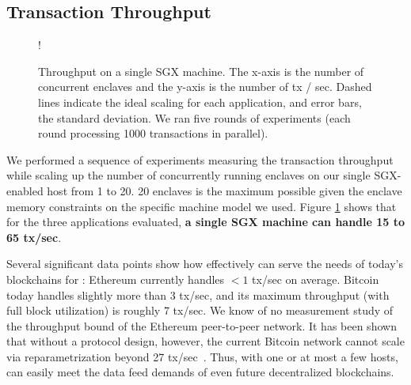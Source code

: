 \subsection{Transaction Throughput}
\begin{figure}[h]
  \resizebox {\columnwidth} {!}{
}
\caption{Throughput on a single SGX machine.  The x-axis is the number of
concurrent enclaves and the y-axis is the number of tx / sec. 
Dashed lines indicate the ideal scaling for each application, and error bars, the standard deviation.
We ran five rounds of experiments (each round processing 1000
transactions in parallel).}

\label{fig:trpt}
\end{figure}
We performed a sequence of experiments measuring the transaction throughput while scaling up the number of concurrently running enclaves 
on our single SGX-enabled host from 1 to 20. 20 \tc enclaves is the maximum possible given the enclave memory constraints on the specific machine model we used.
Figure \ref{fig:trpt}
shows that for the three applications evaluated,
{\bf a single SGX machine can handle
15 to 65
tx/sec}. 

Several significant data points show
how effectively \tc can serve the needs of 
today's blockchains for \tc: 
Ethereum currently handles 
$< 1$ tx/sec on average. 
Bitcoin today handles slightly more than
3 tx/sec, and 
its maximum throughput (with full block utilization)
is roughly 7 tx/sec.
We know of no measurement study of the
throughput bound of the Ethereum  peer-to-peer network.
It has been shown that without
a protocol design, however, the current 
Bitcoin network cannot scale via reparametrization beyond  
27 tx/sec~\cite{blockchainscaling}.
Thus, with one or at most a few hosts, \tc can easily meet the data feed demands of  
even future decentralized blockchains.



